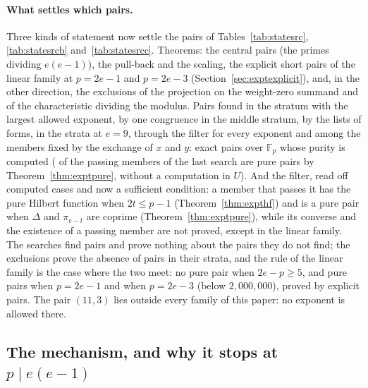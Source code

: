 \documentclass[11pt]{article}
\theoremstyle{definition}
\theoremstyle{remark}
\newcommand{\F}{\mathbb{F}}
\begin{document}
\paragraph{What settles which pairs.} Three kinds of statement now settle the pairs of Tables~\ref{tab:statesrc}, \ref{tab:statesrcb} and~\ref{tab:statesrcc}. Theorems: the central pairs (the primes dividing $e(e-1)$), the pull-back and the scaling, the explicit short pairs of the linear family at $p=2e-1$ and $p=2e-3$ (Section~\ref{sec:exptexplicit}), and, in the other direction, the exclusions of the projection on the weight-zero summand and of the characteristic dividing the modulus. Pairs found in the stratum with the largest allowed exponent, by one congruence in the middle stratum, by the lists of forms, in the strata at $e=9$, through the filter for every exponent and among the members fixed by the exchange of $x$ and $y$: exact pairs over $\F_p$ whose purity is computed (\nsymCOne{} of the \nsymPassing{} passing members of the last search are pure pairs by Theorem~\ref{thm:exptpure}, without a computation in $U$). And the filter, read off computed cases and now a sufficient condition: a member that passes it has the pure Hilbert function when $2t\le p-1$ (Theorem~\ref{thm:expthf}) and is a pure pair when $\Delta$ and $\pi_{e-t}$ are coprime (Theorem~\ref{thm:exptpure}), while its converse and the existence of a passing member are not proved, except in the linear family. The searches find pairs and prove nothing about the pairs they do not find; the exclusions prove the absence of pairs in their strata, and the rule of the linear family is the case where the two meet: no pure pair when $2e-p\ge5$, and pure pairs when $p=2e-1$ and when $p=2e-3$ (below $2{,}000{,}000$), proved by explicit pairs. The pair $(11,3)$ lies outside every family of this paper: no exponent is allowed there.

\subsection{The mechanism, and why it stops at \texorpdfstring{$p\mid e(e-1)$}{p divides e(e-1)}}
\end{document}
